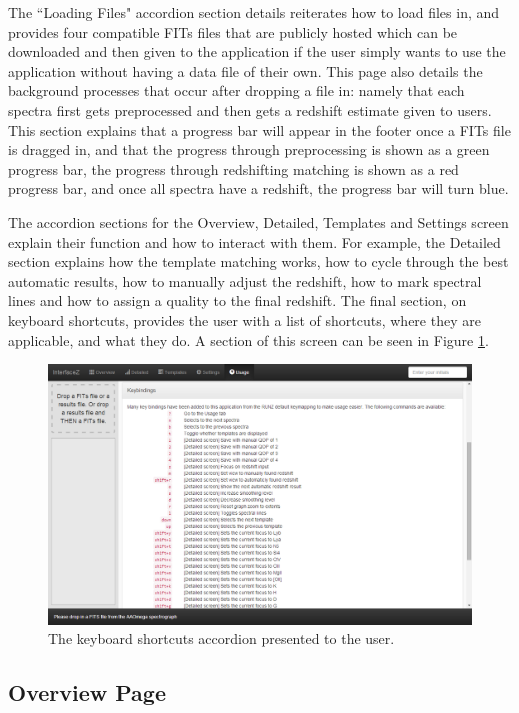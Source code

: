 \documentclass[titlesmallcaps, examinerscopy, copyrightpage]{uqthesis}
\begin{document}
The ``Loading Files" accordion section details reiterates how to load files in, and provides four compatible FITs files that are publicly hosted which can be downloaded and then given to the application if the user simply wants to use the application without having a data file of their own. This page also details the background processes that occur after dropping a file in: namely that each spectra first gets preprocessed and then gets a redshift estimate given to users. This section explains that a progress bar will appear in the footer once a FITs file is dragged in, and that the progress through preprocessing is shown as a green progress bar, the progress through redshifting matching is shown as a red progress bar, and once all spectra have a redshift, the progress bar will turn blue.


The accordion sections for the Overview, Detailed, Templates and Settings screen explain their function and how to interact with them. For example, the Detailed section explains how the template matching works, how to cycle through the best automatic results, how to manually adjust the redshift, how to mark spectral lines and how to assign a quality to the final redshift. The final section, on keyboard shortcuts, provides the user with a list of shortcuts, where they are applicable, and what they do. A section of this screen can be seen in Figure \ref{fig:keyboard}.

\begin{figure}[ht!]
\includegraphics[width=1\textwidth]{images/keybindings.png} 
\centering
\caption{The keyboard shortcuts accordion presented to the user.}
\label{fig:keyboard}
\end{figure}


\pagebreak
\subsection{Overview Page}
\end{document}
